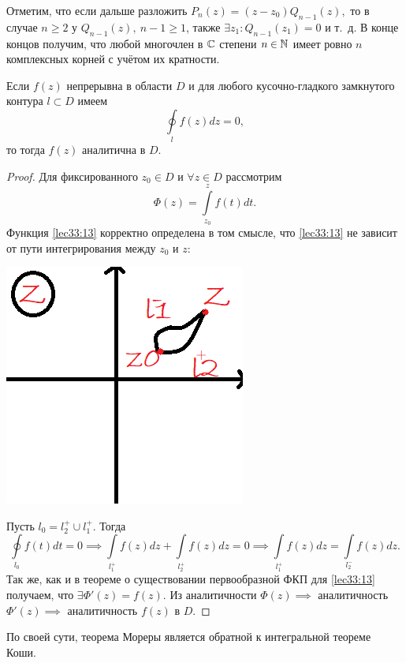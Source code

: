 \documentclass[../../main.tex]{subfiles}
\begin{document}
Отметим, что если дальше разложить $ P_n(z) = (z - z_0)Q_{n - 1}(z), $ 
то в случае $ n \geq 2 $ у $ Q_{n - 1}(z),\ n - 1 \geq 1 $, 
также $ \exists z_1 : Q_{n - 1}(z_1) = 0 $ и т.~д.
В конце концов получим, что любой многочлен в $ \mathbb{C} $ степени $ n \in \mathbb{N} $ 
имеет 
ровно $ n $ комплексных корней с учётом их кратности.

\begin{thm}[Морера]
	Если $ f(z) $ непрерывна в области $ D $ и для любого кусочно-гладкого 
	замкнутого контура $ l \subset D $ имеем
	\begin{equation}
	\label{lec33:12}
	\oint\limits_l f(z) dz = 0,
	\end{equation}
	то тогда $ f(z) $ аналитична в $ D $.
\end{thm}
\begin{proof}
	Для фиксированного $ z_0 \in D $ и
	$ \forall z \in D $ рассмотрим 
	\begin{equation}
	\label{lec33:13}
	\Phi(z) =
	\int\limits_{z_0}^{z} f(t) dt.
	\end{equation}
	Функция \eqref{lec33:13} корректно определена в том смысле, 
	что \eqref{lec33:13} не зависит от пути интегрирования между $z_0$ и $z$:
	\begin{center}
	\includegraphics{lec33_2}
	\end{center}
	Пусть $l_0 = l_2^+ \cup l_1^+$. Тогда
	\[
	\oint\limits_{l_0} f(t) dt = 0 \implies
	\int\limits_{l_1^+} f(z) dz +
	\int\limits_{l_2^+} f(z) dz = 0 \implies 
	\int\limits_{l_1^+} f(z) dz =
	\int\limits_{l_2^-} f(z) dz.
	\]
	Так же, как и в теореме о существовании первообразной
	ФКП для \eqref{lec33:13} получаем, что $ \exists \Phi'(z) = f(z) $. 
	Из аналитичности $ \Phi(z) \implies $ 
	аналитичность $ \Phi'(z) \implies $
	аналитичность $ f(z) $ в $ D $.
\end{proof}
\begin{rem}
	По своей сути, теорема Мореры является обратной
	к интегральной теореме Коши.
\end{rem}
\end{document}
